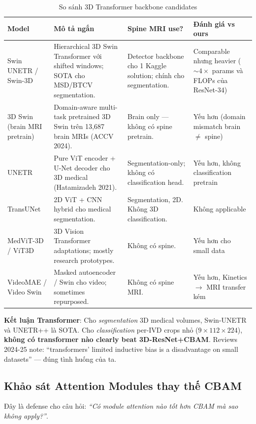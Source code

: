 \documentclass[11pt,a4paper]{article}
\begin{document}
\begin{table}[h]
\centering
\caption{So sánh 3D Transformer backbone candidates}
\small
\begin{tabular}{@{}p{2.8cm}p{4.5cm}p{4.5cm}p{2.5cm}@{}}
\toprule
\rowcolor{tablehdr}
Model & Mô tả ngắn & Spine MRI use? & Đánh giá vs ours \\
\midrule
Swin UNETR / Swin-3D & Hierarchical 3D Swin Transformer với shifted windows; SOTA cho MSD/BTCV segmentation. & Detector backbone cho 1 Kaggle solution; chính cho segmentation. & Comparable nhưng heavier ($\sim 4 \times$ params và FLOPs của ResNet-34) \\
3D Swin (brain MRI pretrain) & Domain-aware multi-task pretrained 3D Swin trên 13,687 brain MRIs (ACCV 2024). & Brain only --- không có spine pretrain. & Yếu hơn (domain mismatch brain $\neq$ spine) \\
UNETR & Pure ViT encoder + U-Net decoder cho 3D medical (Hatamizadeh 2021). & Segmentation-only; không có classification head. & Yếu hơn, không classification pretrain \\
TransUNet & 2D ViT + CNN hybrid cho medical segmentation. & Segmentation, 2D. Không 3D classification. & Không applicable \\
MedViT-3D / ViT3D & 3D Vision Transformer adaptations; mostly research prototypes. & Không có spine. & Yếu hơn cho small data \\
VideoMAE / Video Swin & Masked autoencoder / Swin cho video; sometimes repurposed. & Không có spine MRI. & Yếu hơn, Kinetics $\to$ MRI transfer kém \\
\bottomrule
\end{tabular}
\end{table}

\noindent\textbf{Kết luận Transformer}: Cho \emph{segmentation} 3D
medical volumes, Swin-UNETR và UNETR++ là SOTA. Cho
\emph{classification} per-IVD crops nhỏ ($9 \times 112 \times 224$),
\textbf{không có transformer nào clearly beat 3D-ResNet+CBAM}. Reviews
2024-25 note: ``transformers' limited inductive bias is a disadvantage
on small datasets'' --- đúng tình huống của ta.

\subsection{Khảo sát Attention Modules thay thế CBAM}

\noindent Đây là defense cho câu hỏi: \emph{``Có module attention nào
tốt hơn CBAM mà sao không apply?''}.
\end{document}
